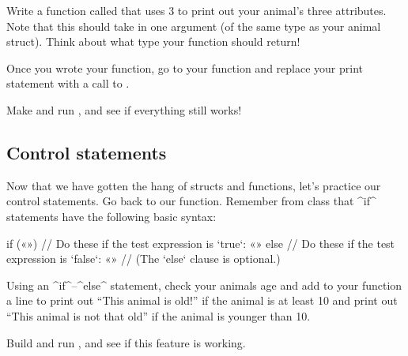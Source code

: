 \documentclass{tufte-handout}
\begin{document}
Write a function called  that uses
3 to print out your animal's three attributes.
Note that this should take in one argument (of the same type as your
animal struct). Think about what type your function should
return!

Once you wrote your function, go to your  function
and replace your print statement with a call to
.

Make and run , and see if everything still works!

\subsection{Control statements}

Now that we have gotten the hang of structs and functions, let's
practice our control statements.  Go back to our
 function.  Remember from class that
^if^ statements have the following basic syntax:

\begin{Code}
    if («») {
        // Do these if the test expression is `true`:
        «»
    } else {
        // Do these if the test expression is `false`:
        «»
        // (The `else` clause is optional.)
    }
\end{Code}

Using an ^if^--^else^ statement, check your animals age and add to your
 function a line to print out ``This animal is
old!'' if the animal is at least 10 and print out ``This animal is not
that old'' if the animal is younger than 10.

Build and run , and see if this feature is working.
\end{document}
